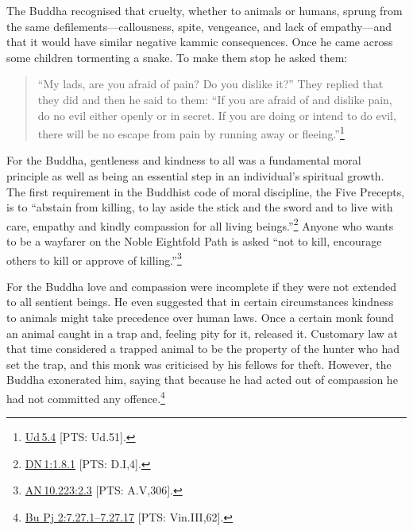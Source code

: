 \documentclass[10pt, openright]{book}
\begin{document}
The Buddha recognised that cruelty, whether to animals or humans, sprung from the same defilements—callousness, spite, vengeance, and lack of empathy—and that it would have similar negative kammic consequences. Once he came across some children tormenting a snake. To make them stop he asked them:


\begin{quote}


“My lads, are you afraid of pain? Do you dislike it?” They replied that they did and then he said to them: “If you are afraid of and dislike pain, do no evil either openly or in secret. If you are doing or intend to do evil, there will be no escape from pain by running away or fleeing.”\footnote {\href{https://suttacentral.net/ud5.4/en/sujato}{Ud 5.4} [PTS: Ud.51].}




\end{quote}
For the Buddha, gentleness and kindness to all was a fundamental moral principle as well as being an essential step in an individual’s spiritual growth. The first requirement in the Buddhist code of moral discipline, the Five Precepts, is to “abstain from killing, to lay aside the stick and the sword and to live with care, empathy and kindly compassion for all living beings.”\footnote {\href{https://suttacentral.net/dn1/en/sujato\#1.8.1}{DN 1:1.8.1} [PTS: D.I,4].} Anyone who wants to be a wayfarer on the Noble Eightfold Path is asked “not to kill, encourage others to kill or approve of killing.”\footnote {\href{https://suttacentral.net/an10.223/en/sujato\#2.3}{AN 10.223:2.3} [PTS: A.V,306].}


For the Buddha love and compassion were incomplete if they were not extended to all sentient beings. He even suggested that in certain circumstances kindness to animals might take precedence over human laws. Once a certain monk found an animal caught in a trap and, feeling pity for it, released it. Customary law at that time considered a trapped animal to be the property of the hunter who had set the trap, and this monk was criticised by his fellows for theft. However, the Buddha exonerated him, saying that because he had acted out of compassion he had not committed any offence.\footnote {\href{https://suttacentral.net/pli-tv-bu-vb-pj2/en/brahmali#7.27.1}{Bu Pj 2:7.27.1–7.27.17} [PTS: Vin.III,62].}
\end{document}
